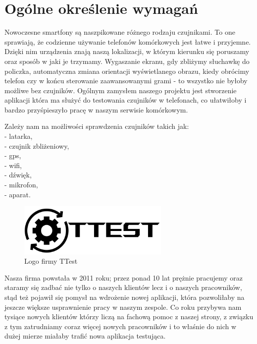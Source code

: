 \section{Ogólne określenie wymagań}		%

\hspace{0.60cm}Nowoczesne smartfony są naszpikowane różnego rodzaju czujnikami. To one sprawiają, że codzienne używanie telefonów komórkowych jest łatwe i przyjemne. Dzięki nim urządzenia znają naszą lokalizacji, w którym kierunku się poruszamy oraz sposób w jaki je trzymamy. Wygaszanie ekranu, gdy zbliżymy słuchawkę do policzka, automatyczna zmiana orientacji wyświetlanego obrazu, kiedy obrócimy telefon czy
w końcu sterowanie zaawansowanymi grami - to wszystko nie byłoby możliwe bez czujników. Ogólnym zamysłem naszego projektu jest stworzenie aplikacji która ma służyć do testowania czujników w telefonach, co ułatwiłoby i bardzo przyśpieszyło pracę w naszym serwisie komórkowym. \newline 

Zależy nam na możliwości sprawdzenia czujników takich jak: \\
- latarka, \\
- czujnik zbliżeniowy, \\
- gps, \\
- wifi, \\
- dźwięk, \\
- mikrofon, \\
- aparat.\\

\begin{figure}[!hbt]
	\begin{center}
		\includegraphics[angle=360, width=0.65\textwidth]{rys/punkt1/logo_black.png}
		\caption{Logo firmy TTest}
		\label{rys:logo}
	\end{center}
\end{figure}

Nasza firma powstała w 2011 roku; przez ponad 10 lat prężnie pracujemy oraz staramy się zadbać nie tylko o naszych klientów lecz i o naszych pracowników, stąd też pojawił się pomysł na wdrożenie nowej aplikacji, która pozwoliłaby na jeszcze większe usprawnienie pracy w naszym zespole. Co roku przybywa nam tysiące nowych klientów którzy liczą na fachową pomoc z naszej strony, z związku z tym zatrudniamy coraz więcej nowych pracowników i to właśnie do nich w dużej mierze miałaby trafić nowa aplikacja testująca. 

